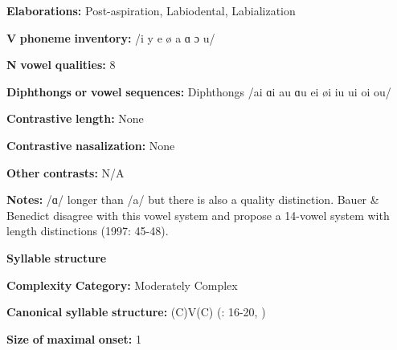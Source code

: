 \begin{styleBody}
\textbf{Elaborations:} Post-aspiration, Labiodental, Labialization
\end{styleBody}

\begin{styleBody}
\textbf{V} \textbf{phoneme} \textbf{inventory:} /i y e ø a ɑ ɔ u/
\end{styleBody}

\begin{styleBody}
\textbf{N} \textbf{vowel} \textbf{qualities:} 8
\end{styleBody}

\begin{styleBody}
\textbf{Diphthongs} \textbf{or} \textbf{vowel} \textbf{sequences:} Diphthongs /ai ɑi au ɑu ei øi iu ui oi ou/
\end{styleBody}

\begin{styleBody}
\textbf{Contrastive} \textbf{length:} None
\end{styleBody}

\begin{styleBody}
\textbf{Contrastive} \textbf{nasalization:} None
\end{styleBody}

\begin{styleBody}
\textbf{Other} \textbf{contrasts:} N/A
\end{styleBody}

\begin{styleBody}
\textbf{Notes:} /ɑ/ longer than /a/ but there is also a quality distinction. Bauer \& Benedict disagree with this vowel system and propose a 14-vowel system with length distinctions (1997: 45-48).
\end{styleBody}

\begin{styleBody}
\textbf{Syllable} \textbf{structure}
\end{styleBody}

\begin{styleBody}
\textbf{Complexity} \textbf{Category:} Moderately Complex
\end{styleBody}

\begin{styleBody}
\textbf{Canonical} \textbf{syllable} \textbf{structure:} (C)V(C) (\citealt{MatthewsYip1994}: 16-20, \citealt{BauerBenedict1997})
\end{styleBody}

\begin{styleBody}
\textbf{Size} \textbf{of} \textbf{maximal} \textbf{onset:} 1
\end{styleBody}


